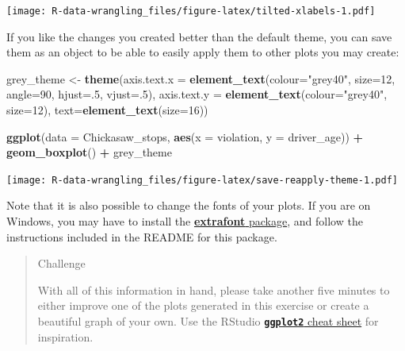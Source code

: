 \documentclass[]{book}
\newenvironment{Shaded}{\begin{snugshade}}{\end{snugshade}}
\newcommand{\DataTypeTok}[1]{\textcolor[rgb]{0.13,0.29,0.53}{#1}}
\newcommand{\DecValTok}[1]{\textcolor[rgb]{0.00,0.00,0.81}{#1}}
\newcommand{\KeywordTok}[1]{\textcolor[rgb]{0.13,0.29,0.53}{\textbf{#1}}}
\newcommand{\NormalTok}[1]{#1}
\newcommand{\OperatorTok}[1]{\textcolor[rgb]{0.81,0.36,0.00}{\textbf{#1}}}
\newcommand{\StringTok}[1]{\textcolor[rgb]{0.31,0.60,0.02}{#1}}
\begin{document}
\texttt{[image: R-data-wrangling\_files/figure-latex/tilted-xlabels-1.pdf]}

If you like the changes you created better than the default theme, you can save them as an object to be able to easily apply them to other plots you may create:

\begin{Shaded}
\begin{Highlighting}[]
\NormalTok{grey_theme <-}\StringTok{ }\KeywordTok{theme}\NormalTok{(}\DataTypeTok{axis.text.x =} \KeywordTok{element_text}\NormalTok{(}\DataTypeTok{colour=}\StringTok{"grey40"}\NormalTok{, }\DataTypeTok{size=}\DecValTok{12}\NormalTok{, }\DataTypeTok{angle=}\DecValTok{90}\NormalTok{, }\DataTypeTok{hjust=}\NormalTok{.}\DecValTok{5}\NormalTok{, }\DataTypeTok{vjust=}\NormalTok{.}\DecValTok{5}\NormalTok{),}
                   \DataTypeTok{axis.text.y =} \KeywordTok{element_text}\NormalTok{(}\DataTypeTok{colour=}\StringTok{"grey40"}\NormalTok{, }\DataTypeTok{size=}\DecValTok{12}\NormalTok{), }\DataTypeTok{text=}\KeywordTok{element_text}\NormalTok{(}\DataTypeTok{size=}\DecValTok{16}\NormalTok{))}

\KeywordTok{ggplot}\NormalTok{(}\DataTypeTok{data =}\NormalTok{ Chickasaw_stops, }\KeywordTok{aes}\NormalTok{(}\DataTypeTok{x =}\NormalTok{ violation, }\DataTypeTok{y =}\NormalTok{ driver_age)) }\OperatorTok{+}
\StringTok{  }\KeywordTok{geom_boxplot}\NormalTok{() }\OperatorTok{+}\StringTok{ }
\StringTok{  }\NormalTok{grey_theme}
\end{Highlighting}
\end{Shaded}

\texttt{[image: R-data-wrangling\_files/figure-latex/save-reapply-theme-1.pdf]}

Note that it is also possible to change the fonts of your plots. If you are on Windows, you may have to install the \href{https://github.com/wch/extrafont}{\textbf{extrafont} package}, and follow the instructions included in the README for this package.

\begin{quote}
Challenge

With all of this information in hand, please take another five minutes to either
improve one of the plots generated in this exercise or create a beautiful graph
of your own. Use the RStudio \href{https://www.rstudio.com/wp-content/uploads/2016/11/ggplot2-cheatsheet-2.1.pdf}{\textbf{\texttt{ggplot2}} cheat sheet} for
inspiration.
\end{quote}
\end{document}

